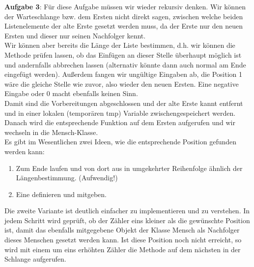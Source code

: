 \documentclass{article}
\begin{document}
\textbf{Aufgabe 3}:
Für diese Aufgabe müssen wir wieder rekursiv denken. Wir können der Warteschlange bzw. dem Ersten nicht direkt sagen, 
zwischen welche beiden Listenelemente der alte Erste gesetzt werden muss, da der Erste nur den neuen Ersten und 
dieser nur seinen Nachfolger kennt. \\
Wir können aber bereits die Länge der Liste bestimmen, d.h. wir können die Methode prüfen lassen, ob das Einfügen 
an dieser Stelle überhaupt möglich ist und andernfalls abbrechen lassen (alternativ könnte dann auch normal 
am Ende eingefügt werden). Außerdem fangen wir ungültige Eingaben ab, die Position 1 wäre die gleiche Stelle wie zuvor,
also wieder den neuen Ersten. Eine negative Eingabe oder 0 macht ebenfalls keinen Sinn. \\
Damit sind die Vorbereitungen abgeschlossen und der alte Erste kannt entfernt und in einer lokalen (temporären tmp) 
Variable zwischengespeichert werden. Danach wird die entsprechende Funktion auf dem Ersten aufgerufen und wir wechseln 
in die Mensch-Klasse. \\
Es gibt im Wesentlichen zwei Ideen, wie die entsprechende Position gefunden werden kann:
\begin{enumerate}
    \item Zum Ende laufen und von dort aus in umgekehrter Reihenfolge  ähnlich der Längenbestimmung. (Aufwendig!)
    \item Eine  definieren und mitgeben.
\end{enumerate}
Die zweite Variante ist deutlich einfacher zu implementieren und zu verstehen. In jedem Schritt wird geprüft, ob der 
Zähler eins kleiner als die gewünschte Position ist, damit das ebenfalls mitgegebene Objekt der Klasse Mensch als 
Nachfolger dieses Menschen gesetzt werden kann. Ist diese Position noch nicht erreicht, so wird mit einem um eins erhöhten Zähler
die Methode auf dem nächsten in der Schlange aufgerufen. 
\end{document}
